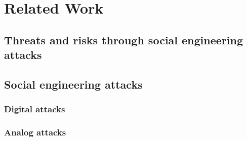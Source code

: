 \chapter{Related Work}
\label{chapter:relatedwork}

\section{Threats and risks through social engineering attacks}

\section{Social engineering attacks}
\subsection{\glqq{}Digital\grqq{} attacks}
\subsection{\glqq{}Analog\grqq{} attacks}

